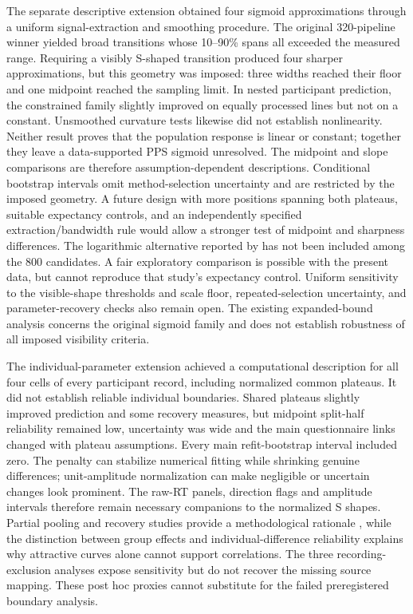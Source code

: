 The separate descriptive extension obtained four sigmoid approximations through a uniform signal-extraction and smoothing procedure. The original 320-pipeline winner yielded broad transitions whose 10--90\% spans all exceeded the measured range. Requiring a visibly S-shaped transition produced four sharper approximations, but this geometry was imposed: three widths reached their floor and one midpoint reached the sampling limit. In nested participant prediction, the constrained family slightly improved on equally processed lines but not on a constant. Unsmoothed curvature tests likewise did not establish nonlinearity. Neither result proves that the population response is linear or constant; together they leave a data-supported PPS sigmoid unresolved. The midpoint and slope comparisons are therefore assumption-dependent descriptions. Conditional bootstrap intervals omit method-selection uncertainty and are restricted by the imposed geometry. A future design with more positions spanning both plateaus, suitable expectancy controls, and an independently specified extraction/bandwidth rule would allow a stronger test of midpoint and sharpness differences. The logarithmic alternative reported by \citet{hobeika2019capturing} has not been included among the 800 candidates. A fair exploratory comparison is possible with the present data, but cannot reproduce that study's expectancy control. Uniform sensitivity to the visible-shape thresholds and scale floor, repeated-selection uncertainty, and parameter-recovery checks also remain open. The existing expanded-bound analysis concerns the original sigmoid family and does not establish robustness of all imposed visibility criteria.

The individual-parameter extension achieved a computational description for all four cells of every participant record, including normalized common plateaus. It did not establish reliable individual boundaries. Shared plateaus slightly improved prediction and some recovery measures, but midpoint split-half reliability remained low, uncertainty was wide and the main questionnaire links changed with plateau assumptions. Every main refit-bootstrap interval included zero. The penalty can stabilize numerical fitting while shrinking genuine differences; unit-amplitude normalization can make negligible or uncertain changes look prominent. The raw-RT panels, direction flags and amplitude intervals therefore remain necessary companions to the normalized S shapes. Partial pooling and recovery studies provide a methodological rationale \citep{Ahn2011}, while the distinction between group effects and individual-difference reliability \citep{Hedge2018} explains why attractive curves alone cannot support correlations. The three recording-exclusion analyses expose sensitivity but do not recover the missing source mapping. These post hoc proxies cannot substitute for the failed preregistered boundary analysis.

